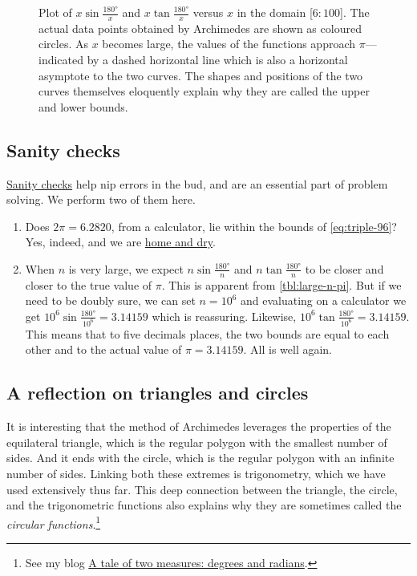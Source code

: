 \documentclass[
  a4paper,
]{article}
\begin{document}
\begin{figure}
\centering

\caption{Plot of \(x\sin\frac{180°}{x}\) and \(x\tan\frac{180°}{x}\)
versus \(x\) in the domain {[}\(6:100\){]}. The actual data points
obtained by Archimedes are shown as coloured circles. As \(x\) becomes
large, the values of the functions approach \(\pi\)---indicated by a
dashed horizontal line which is also a horizontal asymptote to the two
curves. The shapes and positions of the two curves themselves eloquently
explain why they are called the upper and lower bounds.}\label{fig:plot}
\end{figure}

\subsection{Sanity checks}\label{sanity-checks}

\href{https://en.wiktionary.org/wiki/sanity_check}{Sanity checks} help
nip errors in the bud, and are an essential part of problem solving. We
perform two of them here.

\begin{enumerate}
\item
  Does \(2\pi = 6.2820\), from a calculator, lie within the bounds of
  \cref{eq:triple-96}? Yes, indeed, and we are
  \href{https://dictionary.cambridge.org/dictionary/english/be-home-and-dry}{home
  and dry}.
\item
  When \(n\) is very large, we expect \(n\sin\frac{180°}{n}\) and
  \(n\tan\frac{180°}{n}\) to be closer and closer to the true value of
  \(\pi\). This is apparent from \cref{tbl:large-n-pi}. But if we need
  to be doubly sure, we can set \(n = 10^6\) and evaluating on a
  calculator we get \(10^6\sin\frac{180°}{10^6} = 3.14159\) which is
  reassuring. Likewise, \(10^6\tan\frac{180°}{10^6} = 3.14159\). This
  means that to five decimals places, the two bounds are equal to each
  other and to the actual value of \(\pi = 3.14159\). All is well again.
\end{enumerate}

\subsection{A reflection on triangles and
circles}\label{a-reflection-on-triangles-and-circles}

It is interesting that the method of Archimedes leverages the properties
of the equilateral triangle, which is the regular polygon with the
smallest number of sides. And it ends with the circle, which is the
regular polygon with an infinite number of sides. Linking both these
extremes is trigonometry, which we have used extensively thus far. This
deep connection between the triangle, the circle, and the trigonometric
functions also explains why they are sometimes called the \emph{circular
functions}.\footnote{See my blog
  \href{https://swanlotus.netlify.app/blogs/a-tale-of-two-measures-degrees-and-radians}{A
  tale of two measures: degrees and radians}.}
\end{document}
